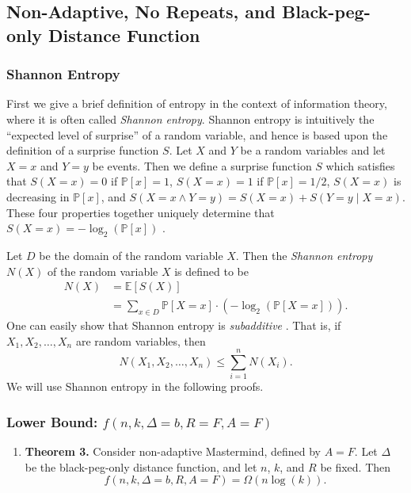 \documentclass[12pt, a4paper]{article}
\begin{document}
\subsection{Non-Adaptive, No Repeats, and Black-peg-only Distance Function}

\subsubsection{Shannon Entropy}\label{sssec:shannonEntropy}
First we give a brief definition of entropy in the context of information theory, where it is often called \textit{Shannon entropy}. Shannon entropy is intuitively the ``expected level of surprise'' of a random variable, and hence is based upon the definition of a surprise function $S$. Let $X$ and $Y$ be a random variables and let $X=x$ and $Y=y$ be events. Then we define a surprise function $S$ which satisfies that $S(X=x) = 0$ if $\mathbb{P}[x] = 1$, $S(X=x) = 1$ if $\mathbb{P}[x] = 1/2$, $S(X=x)$ is decreasing in $\mathbb{P}[x]$, and $S(X=x\land Y=y) = S(X=x) + S(Y=y\mid X=x)$. These four properties together uniquely determine that $S(X=x) = -\log_2(\mathbb{P}[x])$ \cite{DG14}.

Let $D$ be the domain of the random variable $X$. Then the \textit{Shannon entropy} $N(X)$ of the random variable $X$ is defined to be
\begin{align*}
	N(X)
	& = \mathbb{E}[S(X)]\\
	& = \sum_{x\in D}\mathbb{P}[X=x]\cdot (-\log_2(\mathbb{P}[X=x])).
\end{align*}
One can easily show that Shannon entropy is \textit{subadditive} \cite{DG14}. That is, if $X_1, X_2, \ldots, X_n$ are random variables, then
	\begin{equation}\label{subadditivityDefinition}
			N(X_1, X_2, \ldots, X_n)\le \sum_{i=1}^{n}N(X_i).
	\end{equation}
We will use Shannon entropy in the following proofs.

\subsubsection{Lower Bound: $f(n, k, \Delta=b, R=F, A=F)$}
\begin{enumerate}[label=]
	\item\textbf{Theorem 3.} Consider non-adaptive Mastermind, defined by $A=F$. Let $\Delta$ be the black-peg-only distance function, and let $n$, $k$, and $R$ be fixed. Then
	\begin{equation*}
	f(n, k, \Delta = b, R, A=F)=\Omega(n\log(k)).
	\end{equation*}
\end{enumerate}
\end{document}
